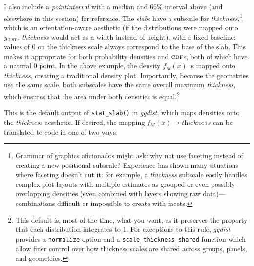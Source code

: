 \documentclass[journal]{vgtc}                     %
\providecommand{\DIFadd}[1]{{\protect\color{blue}\uwave{#1}}} %
\providecommand{\DIFdel}[1]{{\protect\color{red}\sout{#1}}}                      %
\providecommand{\DIFaddbegin}{} %
\providecommand{\DIFaddend}{} %
\providecommand{\DIFdelbegin}{} %
\providecommand{\DIFdelend}{} %
\begin{document}
I also include a \textit{pointinterval} with a median and 66\% interval above (and elsewhere in this section) for reference. The \textit{slab}s have a subscale for \textit{thickness},\footnote{Grammar of graphics aficionados might ask: why not use faceting instead of creating a new positional subscale? Experience has shown many situations where faceting doesn't cut it: for example, a \textit{thickness} subscale easily handles complex plot layouts with multiple estimates as grouped or even possibly-overlapping densities (even combined with layers showing raw data)---combinations difficult or impossible to create with facets.
} which is an orientation-aware aesthetic (if the distributions were mapped onto $y_\textsc{dist}$, \textit{thickness} would act as a width instead of height), with a fixed baseline: values of 0 on the thickness scale always correspond to the base of the slab. This makes it appropriate for both probability densities and $\textsc{cdf}$s, both of which have a natural 0 point. In the above example, the density $f_M(x)$ is mapped onto \textit{thickness}, creating a traditional density plot. Importantly, because the geometries use the same scale, both subscales have the same overall maximum \textit{thickness}, which ensures that the area under both densities is equal.\footnote{This default is, most of the time, what you want, as it \DIFdelbegin \DIFdel{preserves the property that }\DIFdelend \DIFaddbegin \DIFadd{ensures }\DIFaddend each distribution integrates to 1. For exceptions to this rule, \textit{ggdist} provides a \texttt{normalize} option and a \texttt{scale\_thickness\_shared} function which allow finer control over how thickness scales are shared across groups, panels, and geometries.} 

This is the default output of \texttt{stat\_slab()} in \textit{ggdist}, which maps densities onto the \textit{thickness} aesthetic. If desired, the mapping $f_M(x) \rightarrow \textit{thickness}$ can be translated to code in one of two ways:
\end{document}
